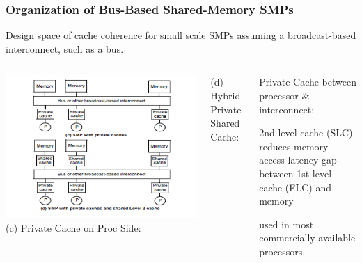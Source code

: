 \documentclass{beamer}
\renewcommand{\emph}[1]{\textcolor{structure}{#1}}
\newcommand{\emp}[1]{\textcolor{DikuRed}{ #1}}
\begin{document}
\begin{frame}[fragile,t]
\frametitle{Organization of Bus-Based Shared-Memory SMPs}

Design space of cache coherence for small scale SMPs 
assuming a broadcast-based interconnect, such as a bus.

\begin{columns}\hspace{-10ex}
\includegraphics[width=50ex]{FigsInfCoherence/PrivCachSMP}
\pause
        \emp{(c) Private Cache on Proc Side}:
\bigskip
\bigskip
\bigskip

        \emph{(d) Hybrid Private-Shared Cache}:
        \begin{itemize}
        \begin{scriptsize}
            \item \emp{Private Cache} between processor \& interconnect:
            \item 2nd level cache (SLC) reduces memory access latency gap
                    between 1st level cache (FLC) and memory
            \item used in most commercially available processors.
        \end {scriptsize}
        \end  {itemize}
\end{columns}

\end{frame}
\end{document}
